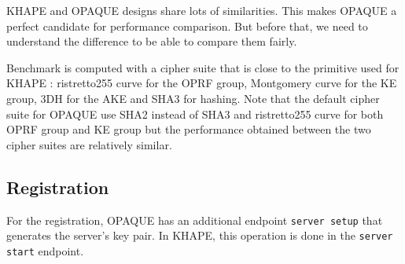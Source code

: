 ﻿\documentclass[../report.tex]{subfiles}
\begin{document}
KHAPE and OPAQUE designs share lots of similarities. This makes OPAQUE a perfect candidate for performance comparison. But before that, we need to understand the difference to be able to compare them fairly.

Benchmark is computed with a cipher suite that is close to the primitive used for KHAPE : ristretto255 curve for the OPRF group, Montgomery curve for the KE group, 3DH for the AKE and SHA3 for hashing.
Note that the default cipher suite for OPAQUE use SHA2 instead of SHA3 and ristretto255 curve for both OPRF group and KE group but the performance obtained between the two cipher suites are relatively similar.
\pgfplotsset{width=\textwidth-1.1cm}

\subsection*{Registration}
For the registration, OPAQUE has an additional endpoint \verb|server setup| that generates the server's key pair. In KHAPE, this operation is done in the \verb|server start| endpoint.
\end{document}
